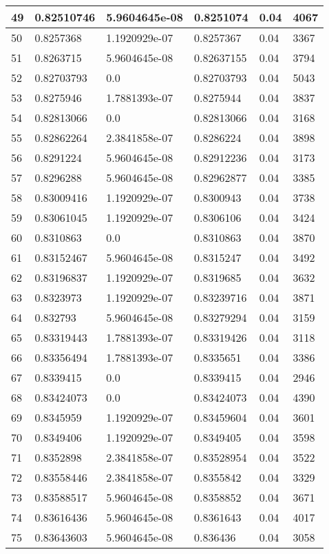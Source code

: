 \begin{longtable}{|l|l|l|l|l|l|}
49 & 0.82510746 & 5.9604645e-08 & 0.8251074 & 0.04 & 4067 \\ \hline 
50 & 0.8257368 & 1.1920929e-07 & 0.8257367 & 0.04 & 3367 \\ \hline 
51 & 0.8263715 & 5.9604645e-08 & 0.82637155 & 0.04 & 3794 \\ \hline 
52 & 0.82703793 & 0.0 & 0.82703793 & 0.04 & 5043 \\ \hline 
53 & 0.8275946 & 1.7881393e-07 & 0.8275944 & 0.04 & 3837 \\ \hline 
54 & 0.82813066 & 0.0 & 0.82813066 & 0.04 & 3168 \\ \hline 
55 & 0.82862264 & 2.3841858e-07 & 0.8286224 & 0.04 & 3898 \\ \hline 
56 & 0.8291224 & 5.9604645e-08 & 0.82912236 & 0.04 & 3173 \\ \hline 
57 & 0.8296288 & 5.9604645e-08 & 0.82962877 & 0.04 & 3385 \\ \hline 
58 & 0.83009416 & 1.1920929e-07 & 0.8300943 & 0.04 & 3738 \\ \hline 
59 & 0.83061045 & 1.1920929e-07 & 0.8306106 & 0.04 & 3424 \\ \hline 
60 & 0.8310863 & 0.0 & 0.8310863 & 0.04 & 3870 \\ \hline 
61 & 0.83152467 & 5.9604645e-08 & 0.8315247 & 0.04 & 3492 \\ \hline 
62 & 0.83196837 & 1.1920929e-07 & 0.8319685 & 0.04 & 3632 \\ \hline 
63 & 0.8323973 & 1.1920929e-07 & 0.83239716 & 0.04 & 3871 \\ \hline 
64 & 0.832793 & 5.9604645e-08 & 0.83279294 & 0.04 & 3159 \\ \hline 
65 & 0.83319443 & 1.7881393e-07 & 0.83319426 & 0.04 & 3118 \\ \hline 
66 & 0.83356494 & 1.7881393e-07 & 0.8335651 & 0.04 & 3386 \\ \hline 
67 & 0.8339415 & 0.0 & 0.8339415 & 0.04 & 2946 \\ \hline 
68 & 0.83424073 & 0.0 & 0.83424073 & 0.04 & 4390 \\ \hline 
69 & 0.8345959 & 1.1920929e-07 & 0.83459604 & 0.04 & 3601 \\ \hline 
70 & 0.8349406 & 1.1920929e-07 & 0.8349405 & 0.04 & 3598 \\ \hline 
71 & 0.8352898 & 2.3841858e-07 & 0.83528954 & 0.04 & 3522 \\ \hline 
72 & 0.83558446 & 2.3841858e-07 & 0.8355842 & 0.04 & 3329 \\ \hline 
73 & 0.83588517 & 5.9604645e-08 & 0.8358852 & 0.04 & 3671 \\ \hline 
74 & 0.83616436 & 5.9604645e-08 & 0.8361643 & 0.04 & 4017 \\ \hline 
75 & 0.83643603 & 5.9604645e-08 & 0.836436 & 0.04 & 3058 \\ \hline 
\end{longtable}